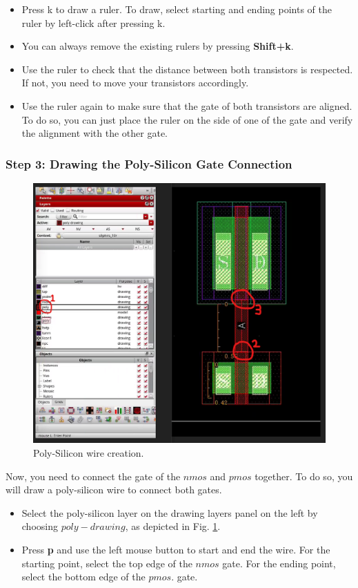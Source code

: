 {	\begin{itemize}
		\item Press k to draw a ruler. To draw, select starting and ending points of the ruler by left-click after pressing k.
		\item You can always remove the existing rulers by pressing \textbf{Shift+k}.
		\item Use the ruler to check that the distance between both transistors is respected. If not, you need to move your transistors accordingly.
		\item Use the ruler again to make sure that the gate of both transistors are aligned. To do so, you can just place the ruler on the side of one of the gate and verify the alignment with the other gate.\end{itemize}
}


\subsubsection*{Step 3: Drawing the Poly-Silicon Gate Connection}
\parbox[t]{\dimexpr\textwidth-\leftmargin}{%
	\begin{figure}
		\vspace{-0mm}
		\centering
		\vspace{-\baselineskip}
		\includegraphics[scale=0.35]{figures/lab2/2}
		\caption{Poly-Silicon wire creation.}
		\label{layout_poly}
	\end{figure}
	Now, you need to connect the gate of the $nmos$ and $pmos$ together. To do so, you will draw a poly-silicon wire to connect both gates. 
	\begin{itemize}
		\item Select the poly-silicon layer on the drawing layers panel on the left by choosing $poly- drawing$, as depicted in Fig. \ref{layout_poly}.
		\item Press \textbf{p} and use the left mouse button to start and end the wire. For the starting point, select the top edge of the $nmos$ gate. For the ending point, select the bottom edge of the $pmos$. gate.\end{itemize}		\vspace{11mm}
}
